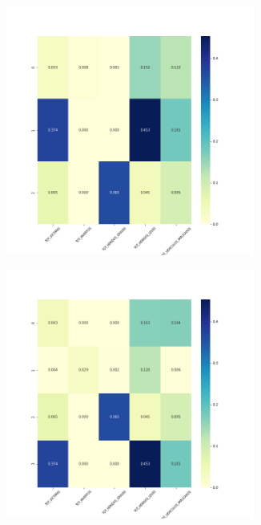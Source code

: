 \begin{figure}[H]
\begin{subfigure}{.5\textwidth}
  \centering
  \includegraphics[width=0.9\textwidth]{imagenes/case1/agglomerative/heatmaps/hm_agglomerative_case1_entrada_k3.png}
\end{subfigure}%
\begin{subfigure}{.5\textwidth}
  \centering
  \includegraphics[width=0.9\textwidth]{imagenes/case1/agglomerative/heatmaps/hm_agglomerative_case1_entrada_k4.png}

\end{subfigure}
\end{figure}

